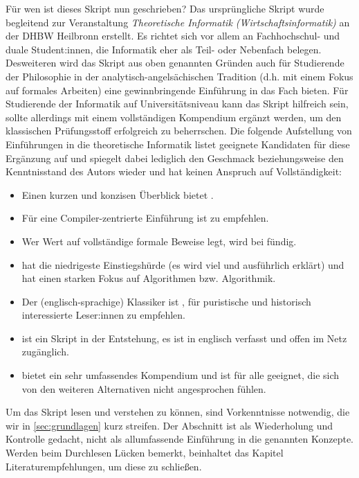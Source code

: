 Für wen ist dieses Skript nun geschrieben?
Das ursprüngliche Skript wurde begleitend zur Veranstaltung
\emph{Theoretische Informatik (Wirtschaftsinformatik)}
an der DHBW Heilbronn erstellt.
Es richtet sich vor allem an Fachhochschul- und duale Student:innen,
die Informatik eher als Teil- oder Nebenfach belegen.
Desweiteren wird das Skript aus oben genannten Gründen auch für Studierende der Philosophie
in der analytisch-angelsächischen Tradition (d.h. mit einem Fokus auf formales Arbeiten)
eine gewinnbringende Einführung in das Fach bieten.
Für Studierende der Informatik auf Universitätsniveau kann das Skript
hilfreich sein,
sollte allerdings mit einem vollständigen Kompendium ergänzt werden,
um den klassischen Prüfungsstoff erfolgreich zu beherrschen.
Die folgende Aufstellung von Einführungen in die theoretische Informatik
listet geeignete Kandidaten für diese Ergänzung auf
und spiegelt dabei lediglich den Geschmack beziehungsweise den Kenntnisstand des Autors wieder
und hat keinen Anspruch auf Vollständigkeit:
\begin{itemize}
    \item  Einen kurzen und konzisen Überblick bietet \cite{schoening}.
    \item  Für eine Compiler-zentrierte Einführung ist \cite{hedtstueck}
           zu empfehlen.
    \item  Wer Wert auf vollständige formale Beweise legt,
           wird bei \cite{erkpriese} fündig.
    \item  \cite{neubert} hat die niedrigeste Einstiegshürde (es wird viel und ausführlich erklärt)
           und hat einen starken Fokus auf Algorithmen bzw. Algorithmik.
    \item  Der (englisch-sprachige) Klassiker ist \cite{hopcroftullman},
           für puristische und historisch interessierte Leser:innen zu empfehlen.
    \item  \cite{barak} ist ein Skript in der Entstehung,
           es ist in englisch verfasst und offen im Netz zugänglich.
    \item  \cite{hoffmann} bietet ein sehr umfassendes Kompendium
            und ist für alle geeignet, die sich von den weiteren Alternativen nicht angesprochen fühlen.
\end{itemize}

Um das Skript lesen und verstehen zu können,
sind Vorkenntnisse notwendig,
die wir in \autoref{sec:grundlagen} kurz streifen.
Der Abschnitt ist als Wiederholung und Kontrolle gedacht,
nicht als allumfassende Einführung in die genannten Konzepte.
Werden beim Durchlesen Lücken bemerkt,
beinhaltet das Kapitel Literaturempfehlungen,
um diese zu schließen.

